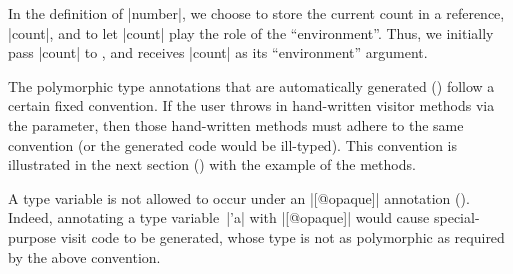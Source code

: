 \documentclass[11pt,a4paper,twoside]{article}
\begin{document}
In the definition of \oc|number|, we choose to store the current count in a
reference, \oc|count|, and to let \oc|count| play the role of the
``environment''. Thus, we initially pass \oc|count| to ,
and  receives \oc|count| as its ``environment'' argument.


The polymorphic type annotations that are automatically generated
() follow a certain fixed convention. If the
user throws in hand-written visitor methods via the \ancestors parameter, then
those hand-written methods must adhere to the same convention (or the
generated code would be ill-typed). This convention is illustrated in the next
section () with the example of the
 methods.

A type variable is not allowed to occur under an \oc|[@opaque]| annotation
(). Indeed, annotating a type variable~\oc|'a| with
\oc|[@opaque]| would cause special-purpose visit code to be generated, whose
type is not as polymorphic as required by the above convention.





\begin{comment}

\subsubsection{Mixing the monomorphic and polymorphic modes}
\label{sec:intro:parameterized:fine}

It is possible to mix the monomorphic and polymorphic modes
(\sref{sec:intro:parameterized:mono}, \sref{sec:intro:parameterized:poly}) in
a single generated visitor class. Suppose we wish to generate a visitor class
for the type \oc|('a, 'b) dictionary|. Suppose, for some reason, that we would
like \tyconvisitor{'a} to be a virtual visitor method and \tyconvisitor{'b} to
be a visitor function, which is passed as an argument to
\tyconvisitor{dictionary}. This can be achieved by declaring
%
\oc|polymorphic = ["'b"]| as part of the \derivingvisitors annotation.


\end{comment}
\end{document}

